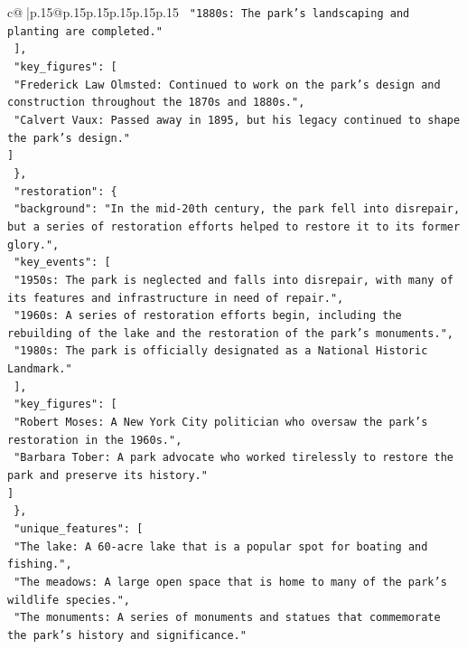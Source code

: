 \documentclass{article}
\begin{document}
{\begin{supertabular}{c@{$\;$}|p{.15\linewidth}@{}p{.15\linewidth}p{.15\linewidth}p{.15\linewidth}p{.15\linewidth}p{.15\linewidth}}
{{{\texttt{        "1880s: The park's landscaping and planting are completed."} \\
\texttt{      {]},} \\
\texttt{      "key\_figures": {[}} \\
\texttt{        "Frederick Law Olmsted: Continued to work on the park's design and construction throughout the 1870s and 1880s.",} \\
\texttt{        "Calvert Vaux: Passed away in 1895, but his legacy continued to shape the park's design."} \\
\texttt{      {]}} \\
\texttt{    \},} \\
\texttt{    "restoration": \{} \\
\texttt{      "background": "In the mid{-}20th century, the park fell into disrepair, but a series of restoration efforts helped to restore it to its former glory.",} \\
\texttt{      "key\_events": {[}} \\
\texttt{        "1950s: The park is neglected and falls into disrepair, with many of its features and infrastructure in need of repair.",} \\
\texttt{        "1960s: A series of restoration efforts begin, including the rebuilding of the lake and the restoration of the park's monuments.",} \\
\texttt{        "1980s: The park is officially designated as a National Historic Landmark."} \\
\texttt{      {]},} \\
\texttt{      "key\_figures": {[}} \\
\texttt{        "Robert Moses: A New York City politician who oversaw the park's restoration in the 1960s.",} \\
\texttt{        "Barbara Tober: A park advocate who worked tirelessly to restore the park and preserve its history."} \\
\texttt{      {]}} \\
\texttt{    \},} \\
\texttt{    "unique\_features": {[}} \\
\texttt{      "The lake: A 60{-}acre lake that is a popular spot for boating and fishing.",} \\
\texttt{      "The meadows: A large open space that is home to many of the park's wildlife species.",} \\
\texttt{      "The monuments: A series of monuments and statues that commemorate the park's history and significance."} \\
}}}
\end{supertabular}}
\end{document}
